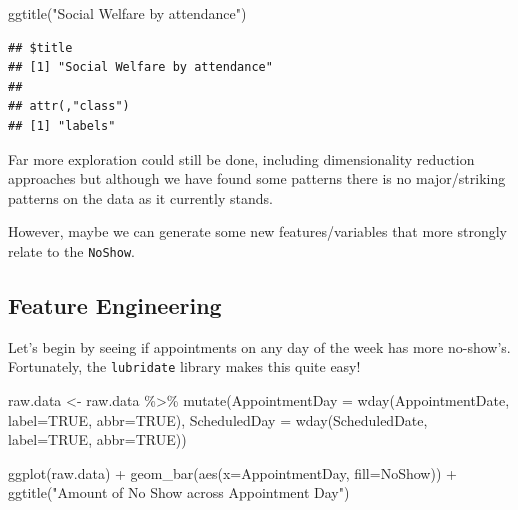 \documentclass[
]{article}
\newenvironment{Shaded}{\begin{snugshade}}{\end{snugshade}}
\newcommand{\AttributeTok}[1]{\textcolor[rgb]{0.77,0.63,0.00}{#1}}
\newcommand{\ConstantTok}[1]{\textcolor[rgb]{0.00,0.00,0.00}{#1}}
\newcommand{\FunctionTok}[1]{\textcolor[rgb]{0.00,0.00,0.00}{#1}}
\newcommand{\NormalTok}[1]{#1}
\newcommand{\OtherTok}[1]{\textcolor[rgb]{0.56,0.35,0.01}{#1}}
\newcommand{\SpecialCharTok}[1]{\textcolor[rgb]{0.00,0.00,0.00}{#1}}
\newcommand{\StringTok}[1]{\textcolor[rgb]{0.31,0.60,0.02}{#1}}
\begin{document}
\begin{Shaded}
\begin{Highlighting}[]
  \FunctionTok{ggtitle}\NormalTok{(}\StringTok{"Social Welfare by attendance"}\NormalTok{)}
\end{Highlighting}
\end{Shaded}

\begin{verbatim}
## $title
## [1] "Social Welfare by attendance"
## 
## attr(,"class")
## [1] "labels"
\end{verbatim}

Far more exploration could still be done, including dimensionality
reduction approaches but although we have found some patterns there is
no major/striking patterns on the data as it currently stands.

However, maybe we can generate some new features/variables that more
strongly relate to the \texttt{NoShow}.

\hypertarget{feature-engineering}{%
\subsection{Feature Engineering}\label{feature-engineering}}

Let's begin by seeing if appointments on any day of the week has more
no-show's. Fortunately, the \texttt{lubridate} library makes this quite
easy!

\begin{Shaded}
\begin{Highlighting}[]
\NormalTok{raw.data }\OtherTok{\textless{}{-}}\NormalTok{ raw.data }\SpecialCharTok{\%\textgreater{}\%} \FunctionTok{mutate}\NormalTok{(}\AttributeTok{AppointmentDay =} \FunctionTok{wday}\NormalTok{(AppointmentDate, }\AttributeTok{label=}\ConstantTok{TRUE}\NormalTok{, }\AttributeTok{abbr=}\ConstantTok{TRUE}\NormalTok{), }
                                 \AttributeTok{ScheduledDay =} \FunctionTok{wday}\NormalTok{(ScheduledDate,  }\AttributeTok{label=}\ConstantTok{TRUE}\NormalTok{, }\AttributeTok{abbr=}\ConstantTok{TRUE}\NormalTok{))}

\FunctionTok{ggplot}\NormalTok{(raw.data) }\SpecialCharTok{+}
  \FunctionTok{geom\_bar}\NormalTok{(}\FunctionTok{aes}\NormalTok{(}\AttributeTok{x=}\NormalTok{AppointmentDay, }\AttributeTok{fill=}\NormalTok{NoShow)) }\SpecialCharTok{+}
  \FunctionTok{ggtitle}\NormalTok{(}\StringTok{"Amount of No Show across Appointment Day"}\NormalTok{) }
\end{Highlighting}
\end{Shaded}
\end{document}
